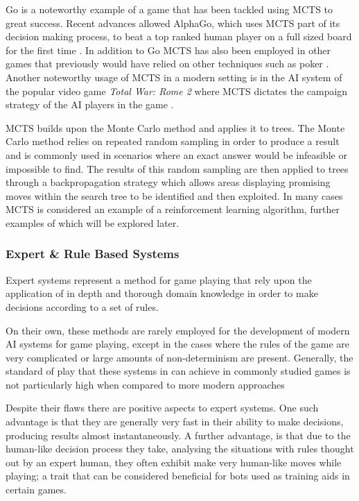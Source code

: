 \documentclass[]{article}
\begin{document}
\par Go is a noteworthy example of a game that has been tackled using MCTS to great success. Recent advances allowed AlphaGo, which uses MCTS part of its decision making process, to beat a top ranked human player on a full sized board for the first time \autocite{churchland2016computational, chang2016google}. In addition to Go MCTS has also been employed in other games that previously would have relied on other techniques such as poker \autocite{van2009monte}. Another noteworthy usage of MCTS in a modern setting is in the AI system of the popular video game \textit{Total War: Rome 2} where MCTS dictates the campaign strategy of the AI players in the game \autocite{champandard2014monte}. 

\par MCTS builds upon the Monte Carlo method and applies it to trees. The Monte Carlo method relies on repeated random sampling in order to produce a result and is commonly used in scenarios where an exact answer would be infeasible or impossible to find. The results of this random sampling are then applied to trees through a backpropagation strategy which allows areas displaying promising moves within the search tree to be identified and then exploited. In many cases MCTS is considered an example of a reinforcement learning algorithm, further examples of which will be explored later.

\subsubsection{Expert \& Rule Based Systems}

Expert systems represent a method for game playing that rely upon the application of in depth and thorough domain knowledge in order to make decisions according to a set of rules. 

\par On their own, these methods are rarely employed for the development of modern AI systems for game playing, except in the cases where the rules of the game are very complicated \autocite{thomas2003real} or large amounts of non-determinism are present. Generally, the standard of play that these systems in can achieve in commonly studied games is not particularly high when compared to more modern approaches

\par Despite their flaws there are positive aspects to expert systems. One such advantage is that they are generally very fast in their ability to make decisions, producing results almost instantaneously. A further advantage, is that due to the human-like decision process they take, analysing the situations with rules thought out by an expert human, they often exhibit make very human-like moves while playing; a trait that can be considered beneficial for bots used as training aids in certain games.
\end{document}

